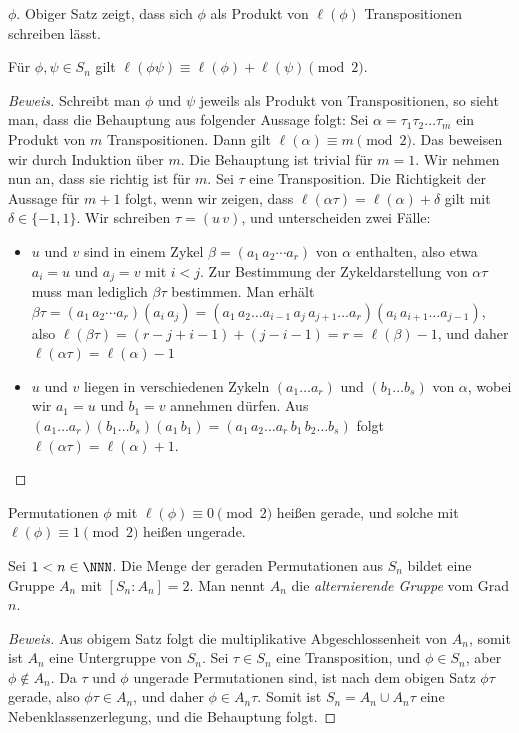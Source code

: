 \documentclass[12pt,a4paper,twoside]{article}
\newcommand{\ei}[1]{\emph{#1}\index{#1}}
\begin{document}
$\phi$. Obiger Satz zeigt, dass sich $\phi$ als Produkt von $\ell(\phi)$
Transpositionen schreiben l\"asst.
\begin{Satz}
  F\"ur $\phi,\psi\in S_n$ gilt
  $\ell(\phi\psi)\equiv\ell(\phi)+\ell(\psi)\pmod{2}$.
\end{Satz}
\begin{proof}[Beweis]
  Schreibt man $\phi$ und $\psi$ jeweils als Produkt von Transpositionen, so
  sieht man, dass die Behauptung aus folgender Aussage folgt: Sei
  $\alpha=\tau_1\tau_2\dots\tau_m$ ein Produkt von $m$ Transpositionen. Dann
  gilt $\ell(\alpha)\equiv m\pmod{2}$. Das beweisen wir durch Induktion \"uber
  $m$. Die Behauptung ist trivial f\"ur $m=1$. Wir nehmen nun an, dass sie
  richtig ist f\"ur $m$. Sei $\tau$ eine Transposition. Die Richtigkeit der
  Aussage f\"ur $m+1$ folgt, wenn wir zeigen, dass
  $\ell(\alpha\tau)=\ell(\alpha)+\delta$ gilt mit $\delta\in\{-1,1\}$. Wir
  schreiben $\tau=(u\,v)$, und unterscheiden zwei F\"alle:
\begin{itemize}
\item[(i)] $u$ und $v$ sind in einem Zykel $\beta=(a_1\,a_2\cdots a_r)$ von
  $\alpha$ enthalten, also etwa $a_i=u$ und $a_j=v$ mit $i<j$. Zur Bestimmung
  der Zykeldarstellung von $\alpha\tau$ muss man lediglich $\beta\tau$
  bestimmen. Man erh\"alt $\beta\tau=(a_1\,a_2\cdots
  a_r)(a_i\,a_j)=(a_1\,a_2\dots a_{i-1}\,a_j\,a_{j+1}\dots
  a_r)(a_i\,a_{i+1}\dots a_{j-1})$, also
  $\ell(\beta\tau)=(r-j+i-1)+(j-i-1)=r=\ell(\beta)-1$, und daher
  $\ell(\alpha\tau)=\ell(\alpha)-1$
\item[(ii)] $u$ und $v$ liegen in verschiedenen Zykeln $(a_1\dots a_r)$ und
  $(b_1\dots b_s)$ von $\alpha$, wobei wir $a_1=u$ und $b_1=v$ annehmen
  d\"urfen. Aus $(a_1\dots a_r)(b_1\dots b_s)(a_1\,b_1)=(a_1\,a_2\dots
  a_r\,b_1\,b_2\dots b_s)$ folgt $\ell(\alpha\tau)=\ell(\alpha)+1$.
\end{itemize}
\end{proof}
\begin{Definition}
  Permutationen $\phi$ mit $\ell(\phi)\equiv0\pmod{2}$ hei\ss en gerade, und
  solche mit $\ell(\phi)\equiv1\pmod{2}$ hei\ss en ungerade.
\end{Definition}
\begin{Satz}
  Sei $1<n\in\NNN$. Die Menge der geraden Permutationen aus $S_n$ bildet eine
  Gruppe $A_n$ mit $[S_n:A_n]=2$. Man nennt $A_n$ die \ei{alternierende
  Gruppe} vom Grad $n$.
\end{Satz}
\begin{proof}[Beweis]
  Aus obigem Satz folgt die multiplikative Abgeschlossenheit von $A_n$, somit
  ist $A_n$ eine Untergruppe von $S_n$. Sei $\tau\in S_n$ eine Transposition,
  und $\phi\in S_n$, aber $\phi\notin A_n$. Da $\tau$ und $\phi$ ungerade
  Permutationen sind, ist nach dem obigen Satz $\phi\tau$ gerade, also
  $\phi\tau\in A_n$, und daher $\phi\in A_n\tau$. Somit ist $S_n=A_n\cup
  A_n\tau$ eine Nebenklassenzerlegung, und die Behauptung folgt.
\end{proof}
\end{document}
